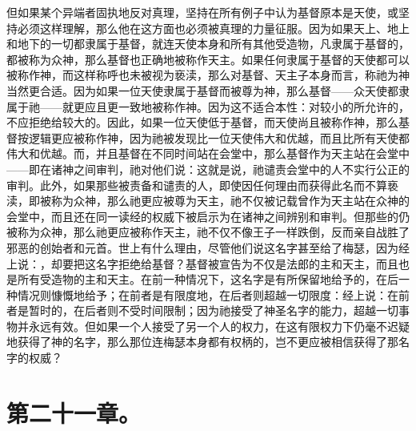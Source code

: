 但如果某个异端者固执地反对真理，坚持在所有例子中认为基督原本是天使，或坚持必须这样理解，那么他在这方面也必须被真理的力量征服。因为如果天上、地上和地下的一切都隶属于基督，就连天使本身和所有其他受造物，凡隶属于基督的，都被称为众神，那么基督也正确地被称作天主。如果任何隶属于基督的天使都可以被称作神，而这样称呼也未被视为亵渎，那么对基督、天主子本身而言，称祂为神当然更合适。因为如果一位天使隶属于基督而被尊为神，那么基督——众天使都隶属于祂——就更应且更一致地被称作神。因为这不适合本性：对较小的所允许的，不应拒绝给较大的。因此，如果一位天使低于基督，而天使尚且被称作神，那么基督按逻辑更应被称作神，因为祂被发现比一位天使伟大和优越，而且比所有天使都伟大和优越。而，并且基督在不同时间站在会堂中，那么基督作为天主站在会堂中——即在诸神之间审判，祂对他们说：这就是说，祂谴责会堂中的人不实行公正的审判。此外，如果那些被责备和谴责的人，即使因任何理由而获得此名而不算亵渎，即被称为众神，那么祂更应被尊为天主，祂不仅被记载曾作为天主站在众神的会堂中，而且还在同一读经的权威下被启示为在诸神之间辨别和审判。但那些的仍被称为众神，那么祂更应被称作天主，祂不仅不像王子一样跌倒，反而亲自战胜了邪恶的创始者和元首。世上有什么理由，尽管他们说这名字甚至给了梅瑟，因为经上说：，却要把这名字拒绝给基督？基督被宣告为不仅是法郎的主和天主，而且也是所有受造物的主和天主。在前一种情况下，这名字是有所保留地给予的，在后一种情况则慷慨地给予；在前者是有限度地，在后者则超越一切限度：经上说：在前者是暂时的，在后者则不受时间限制；因为祂接受了神圣名字的能力，超越一切事物并永远有效。但如果一个人接受了另一个人的权力，在这有限权力下仍毫不迟疑地获得了神的名字，那么那位连梅瑟本身都有权柄的，岂不更应被相信获得了那名字的权威？\par


\section{第二十一章。}

\par

